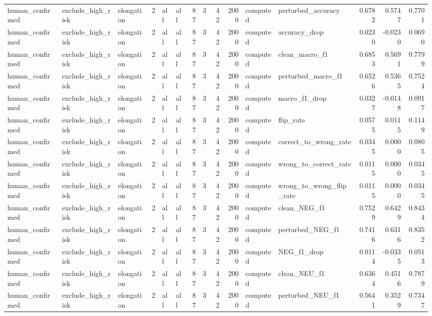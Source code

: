 \begin{tabular}{lllrllrrrrllrrr}
human_confirmed & exclude_high_risk & elongation & 2 & all & all & 87 & 3 & 42 & 2000 & computed & perturbed_accuracy & 0.6782 & 0.5747 & 0.7701 \\
human_confirmed & exclude_high_risk & elongation & 2 & all & all & 87 & 3 & 42 & 2000 & computed & accuracy_drop & 0.0230 & -0.0230 & 0.0690 \\
human_confirmed & exclude_high_risk & elongation & 2 & all & all & 87 & 3 & 42 & 2000 & computed & clean_macro_f1 & 0.6853 & 0.5691 & 0.7799 \\
human_confirmed & exclude_high_risk & elongation & 2 & all & all & 87 & 3 & 42 & 2000 & computed & perturbed_macro_f1 & 0.6526 & 0.5365 & 0.7524 \\
human_confirmed & exclude_high_risk & elongation & 2 & all & all & 87 & 3 & 42 & 2000 & computed & macro_f1_drop & 0.0327 & -0.0148 & 0.0917 \\
human_confirmed & exclude_high_risk & elongation & 2 & all & all & 87 & 3 & 42 & 2000 & computed & flip_rate & 0.0575 & 0.0115 & 0.1149 \\
human_confirmed & exclude_high_risk & elongation & 2 & all & all & 87 & 3 & 42 & 2000 & computed & correct_to_wrong_rate & 0.0345 & 0.0000 & 0.0805 \\
human_confirmed & exclude_high_risk & elongation & 2 & all & all & 87 & 3 & 42 & 2000 & computed & wrong_to_correct_rate & 0.0115 & 0.0000 & 0.0345 \\
human_confirmed & exclude_high_risk & elongation & 2 & all & all & 87 & 3 & 42 & 2000 & computed & wrong_to_wrong_flip_rate & 0.0115 & 0.0000 & 0.0345 \\
human_confirmed & exclude_high_risk & elongation & 2 & all & all & 87 & 3 & 42 & 2000 & computed & clean_NEG_f1 & 0.7529 & 0.6429 & 0.8434 \\
human_confirmed & exclude_high_risk & elongation & 2 & all & all & 87 & 3 & 42 & 2000 & computed & perturbed_NEG_f1 & 0.7416 & 0.6316 & 0.8352 \\
human_confirmed & exclude_high_risk & elongation & 2 & all & all & 87 & 3 & 42 & 2000 & computed & NEG_f1_drop & 0.0114 & -0.0335 & 0.0513 \\
human_confirmed & exclude_high_risk & elongation & 2 & all & all & 87 & 3 & 42 & 2000 & computed & clean_NEU_f1 & 0.6364 & 0.4516 & 0.7879 \\
human_confirmed & exclude_high_risk & elongation & 2 & all & all & 87 & 3 & 42 & 2000 & computed & perturbed_NEU_f1 & 0.5641 & 0.3529 & 0.7347 \\

\end{tabular}
